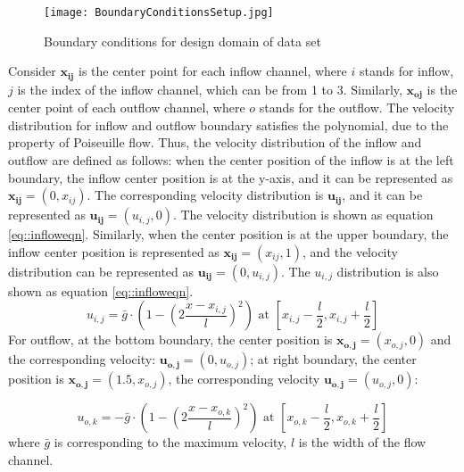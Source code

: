 \documentclass{article}
\begin{document}
\begin{figure}
    \centering
    \texttt{[image: BoundaryConditionsSetup.jpg]}
    \caption{Boundary conditions for design domain of data set \uppercase\expandafter{}}
    \label{fig::RegionBgin}
\end{figure}


Consider $\mathbf{x_{ij}}$ is the center point for each inflow channel, where $i$ stands for inflow, $j$ is the index of the inflow channel, which can be from 1 to 3. Similarly, $\mathbf{x_{oj}}$ is the center point of each outflow channel, where $o$ stands for the outflow. The velocity distribution for inflow and outflow boundary satisfies the polynomial, due to the property of Poiseuille flow. Thus, the velocity distribution of the inflow and outflow  are defined as follows:
 when the center position of the inflow is at the left boundary, the inflow center position is at the y-axis, and it can be represented as $\mathbf{x_{ij}} = (0, x_{ij})$. The corresponding velocity distribution is $\boldsymbol{u_{ij}}$, and it can be represented as
$\boldsymbol{u_{ij}} = (u_{i,j},0)$. The  velocity distribution is shown as equation \eqref{eq::infloweqn}. Similarly, when the center position is at the upper boundary, the inflow center position is represented as $\mathbf{x_{ij}} = (x_{ij}, 1)$, and the velocity distribution can be represented as $\boldsymbol{u_{ij}} = (0,u_{i,j})$. The  $u_{i,j}$ distribution is also shown as equation \eqref{eq::infloweqn}.
\begin{equation}\label{eq::infloweqn}
u_{i,j} =\bar{g} \cdot\left(1-\left(2 \frac{x-x_{i,j}}{l}\right)^2\right) \text { at }\left[x_{i,j}-\frac{l}{2}, x_{i,j}+\frac{l}{2}\right]
\end{equation}
For outflow, at the bottom boundary, the center position is  $\boldsymbol{x_{o,j}} = (x_{o,j}, 0)$
and the corresponding velocity: $\boldsymbol{u_{o,j}} = (0, u_{o,j})$; at right boundary, the center position is  $\boldsymbol{x_{o,j}} = (1.5, x_{o,j})$, the corresponding velocity $\boldsymbol{u_{o,j}} = (u_{o,j}, 0)$:

\begin{equation}
u_{o,k} =-\bar{g} \cdot\left(1-\left(2 \frac{x-x_{o,k}}{l}\right)^2\right) \text { at }\left[x_{o,k}-\frac{l}{2}, x_{o,k}+\frac{l}{2}\right]
\end{equation}
where $\bar{g}$ is corresponding to the maximum velocity, $l$ is the width of the flow channel.
\end{document}
